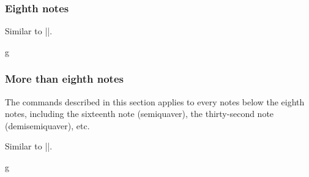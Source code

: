 \subsubsection{Eighth notes}\label{sec:music-notes:commands:eighth}
\begin{command}{\tmeighth{}}
  Similar to |\tmhalf|.
\end{command}
\begin{codeexample}[]
\begin{tmline}%
\begin{tmstaff}{g}{}
           
        
                 
          
\end{tmstaff}%
\end{tmline}
\end{codeexample}
\subsubsection{More than eighth notes}\label{sec:music-notes:commands:more-than-eighth}
The commands described in this section applies to every notes below the eighth 
notes, including the sixteenth note (semiquaver), the thirty-second note 
(demisemiquaver), etc.
\begin{command}{\tmmorethaneighth{}}
  Similar to |\tmhalf|.
\end{command}
\begin{codeexample}[]
\begin{tmline}%
\begin{tmstaff}{g}{}
\end{tmstaff}%
\end{tmline}
\end{codeexample}
